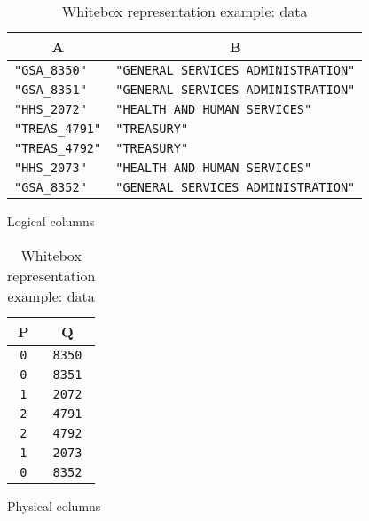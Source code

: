 \begin{table}[h]
\centering
\begin{minipage}{.75\linewidth}
\centering
\begin{tabular}{@{}ll@{}}
\toprule
\multicolumn{1}{c}{A} & \multicolumn{1}{c}{B}                    \\ \midrule
\verb|"GSA_8350"|     & \verb|"GENERAL SERVICES ADMINISTRATION"| \\
\verb|"GSA_8351"|     & \verb|"GENERAL SERVICES ADMINISTRATION"| \\
\verb|"HHS_2072"|     & \verb|"HEALTH AND HUMAN SERVICES"|       \\
\verb|"TREAS_4791"|   & \verb|"TREASURY"|                        \\
\verb|"TREAS_4792"|   & \verb|"TREASURY"|                        \\
\verb|"HHS_2073"|     & \verb|"HEALTH AND HUMAN SERVICES"|       \\
\verb|"GSA_8352"|     & \verb|"GENERAL SERVICES ADMINISTRATION"| \\ \bottomrule
\end{tabular}
\caption*{Logical columns}
\end{minipage}%
\begin{minipage}{.25\linewidth}
\centering
\begin{tabular}{@{}cc@{}}
\toprule
P        & Q           \\ \midrule
\verb|0| & \verb|8350| \\
\verb|0| & \verb|8351| \\
\verb|1| & \verb|2072| \\
\verb|2| & \verb|4791| \\
\verb|2| & \verb|4792| \\
\verb|1| & \verb|2073| \\
\verb|0| & \verb|8352| \\ \bottomrule
\end{tabular}
\caption*{Physical columns}
\end{minipage}
\caption{Whitebox representation example: data}
\label{tab:exprlang:exprlang_2}
\end{table}

